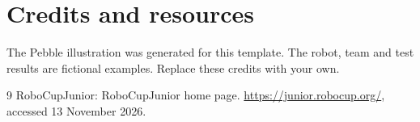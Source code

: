 \documentclass[runningheads]{llncs}
\begin{document}
\section{Credits and resources}
The Pebble illustration was generated for this template. The robot, team and
test results are fictional examples. Replace these credits with your own.

\begin{thebibliography}{9}
RoboCupJunior: RoboCupJunior home page. \url{https://junior.robocup.org/},
accessed 13 November 2026.
\end{thebibliography}
\end{document}

